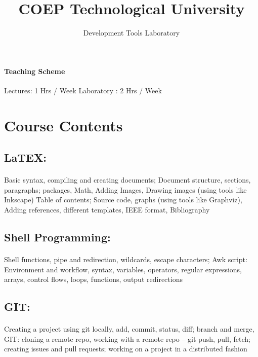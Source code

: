 \documentclass{article}
\title{COEP Technological University}
\date{Development Tools Laboratory}
\begin{document}
\tableofcontents	
	\maketitle
	\paragraph{Teaching Scheme}
Lectures: 1 Hrs / Week
Laboratory : 2 Hrs / Week
	\section{Course Contents}

	\subsection{LaTEX:}
	\paragraph{}
	Basic syntax, compiling and creating documents; Document structure, sections,
paragraphs; packages, Math, Adding Images, Drawing images (using tools like Inkscape) Table
of contents; Source code, graphs (using tools like Graphviz), Adding references, different
templates, IEEE format, Bibliography

	\subsection{Shell Programming:}
	\paragraph{}
Shell functions, pipe and redirection, wildcards, escape characters; Awk script: Environment and
workflow, syntax, variables, operators, regular expressions, arrays, control flows, loops,
functions, output redirections



\subsection{GIT:}
	\paragraph{}
Creating a project using git locally, add, commit, status, diff; branch and merge, GIT:
cloning a remote repo, working with a remote repo – git push, pull, fetch; creating issues and pull
requests; working on a project in a distributed fashion
\end{document}
